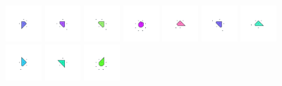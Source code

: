 \documentclass[text.tex]{subfiles}
\begin{document}
\begin{figure}[h!]
\includegraphics[width=0.12\textwidth]{img/results/circle8/circle8_241421_(0_1alpha_1)_005.pdf}
\includegraphics[width=0.12\textwidth]{img/results/circle8/circle8_241421_(0_1alpha_1)_006.pdf}
\includegraphics[width=0.12\textwidth]{img/results/circle8/circle8_241421_(0_1alpha_1)_007.pdf}
\includegraphics[width=0.12\textwidth]{img/results/circle8/circle8_241421_(0_1alpha_1)_008.pdf}
\includegraphics[width=0.12\textwidth]{img/results/circle8/circle8_241421_(0_1alpha_1)_009.pdf}
\includegraphics[width=0.12\textwidth]{img/results/circle8/circle8_241421_(0_1alpha_1)_010.pdf}
\includegraphics[width=0.12\textwidth]{img/results/circle8/circle8_241421_(0_1alpha_1)_011.pdf}
\includegraphics[width=0.12\textwidth]{img/results/circle8/circle8_241421_(0_1alpha_1)_012.pdf}
\includegraphics[width=0.12\textwidth]{img/results/circle8/circle8_241421_(0_1alpha_1)_013.pdf}
\includegraphics[width=0.12\textwidth]{img/results/circle8/circle8_241421_(0_1alpha_1)_014.pdf}
\end{figure}
\end{document}
